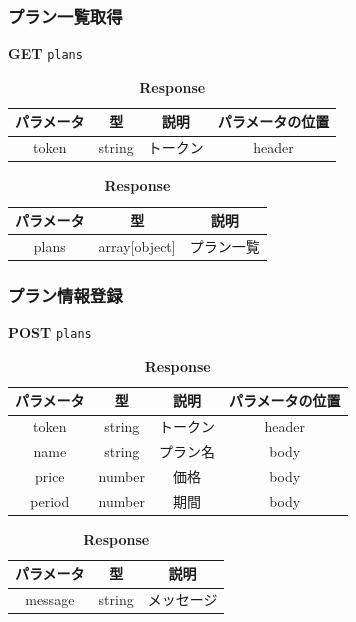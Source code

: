 \subsubsection*{プラン一覧取得}
\textbf{GET} \texttt{plans}
\begin{table}[H]
  \begin{minipage}
    {0.5\hsize}
    \centering
    \captionsetup{labelformat=empty,labelsep=none} \caption{\textbf{Request}}
    \small
    \begin{tabular}{|c|c|c|c|} \hline
      パラメータ & 型      & 説明   & パラメータの位置 \\ \hline \hline
      token & string & トークン & header   \\ \hline
    \end{tabular}
  \end{minipage}
  \begin{minipage}
    {0.5\hsize}
    \centering
    \captionsetup{labelformat=empty,labelsep=none} \caption{\textbf{Response}}
    \begin{tabular}{|c|c|c|} \hline
      パラメータ & 型             & 説明    \\ \hline \hline
      plans & array[object] & プラン一覧 \\ \hline
    \end{tabular}
  \end{minipage}
\end{table}

\subsubsection*{プラン情報登録}
\textbf{POST} \texttt{plans}
\begin{table}[H]
  \begin{minipage}
    {0.5\hsize}
    \centering
    \captionsetup{labelformat=empty,labelsep=none} \caption{\textbf{Request}}
    \small
    \begin{tabular}{|c|c|c|c|} \hline
      パラメータ  & 型      & 説明   & パラメータの位置 \\ \hline \hline
      token  & string & トークン & header   \\ \hline
      name   & string & プラン名 & body     \\ \hline
      price  & number & 価格   & body     \\ \hline
      period & number & 期間   & body     \\ \hline
    \end{tabular}
  \end{minipage}
  \begin{minipage}
    {0.5\hsize}
    \centering
    \captionsetup{labelformat=empty,labelsep=none} \caption{\textbf{Response}}
    \begin{tabular}{|c|c|c|} \hline
      パラメータ   & 型      & 説明    \\ \hline \hline
      message & string & メッセージ \\ \hline
    \end{tabular}
  \end{minipage}
\end{table}
\hrulefill

